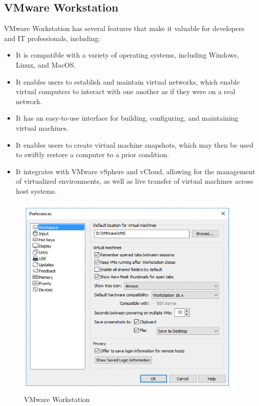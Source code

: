 \documentclass[11pt, a4paper, openany]{book}
\begin{document}
\subsection{VMware Workstation}
VMware Workstation has several features that make it valuable for developers and IT professionals, including:
 \begin{itemize}
        \item It is compatible with a variety of operating systems, including Windows, Linux, and MacOS.
        \item It enables users to establish and maintain virtual networks, which enable virtual computers to interact with one    another as if they were on a real network.
        \item It has an easy-to-use interface for building, configuring, and maintaining virtual machines.
        \item It enables users to create virtual machine snapshots, which may then be used to swiftly restore a computer to a prior 
         condition.
        \item It integrates with VMware vSphere and vCloud, allowing for the management of virtualized environments, as well as live transfer of virtual machines across host systems.
 \end{itemize}
 \begin{figure}[H]
\centering
   \includegraphics[scale=0.6]{Labbot&ele/vmware.png}
    \caption{VMware Workstation}
    \label{fig:VMware Workstation}
\end{figure}\
\end{document}
